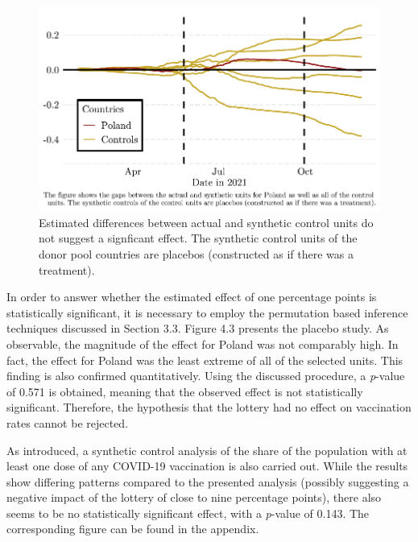 \documentclass{scrbook}
\begin{document}
\begin{figure}[h]
\caption[Placebo plot of Poland and donor pool]{Estimated differences between actual and synthetic control units do not suggest a signficant effect. The synthetic control units of the donor pool countries are placebos (constructed as if there was a treatment).}

\begin{center}\includegraphics{bachelor_thesis_files/figure-latex/unnamed-chunk-4-1} \end{center}
\end{figure}

\vspace{-0.2cm}

In order to answer whether the estimated effect of one percentage points
is statistically significant, it is necessary to employ the permutation
based inference techniques discussed in Section 3.3. Figure 4.3 presents
the placebo study. As observable, the magnitude of the effect for Poland
was not comparably high. In fact, the effect for Poland was the least
extreme of all of the selected units. This finding is also confirmed
quantitatively. Using the discussed procedure, a \textit{p}-value of
0.571 is obtained, meaning that the observed effect is not statistically
significant. Therefore, the hypothesis that the lottery had no effect on
vaccination rates cannot be rejected.

As introduced, a synthetic control analysis of the share of the
population with at least one dose of any COVID-19 vaccination is also
carried out. While the results show differing patterns compared to the
presented analysis (possibly suggesting a negative impact of the lottery
of close to nine percentage points), there also seems to be no
statistically significant effect, with a \textit{p}-value of 0.143. The
corresponding figure can be found in the appendix.
\end{document}
